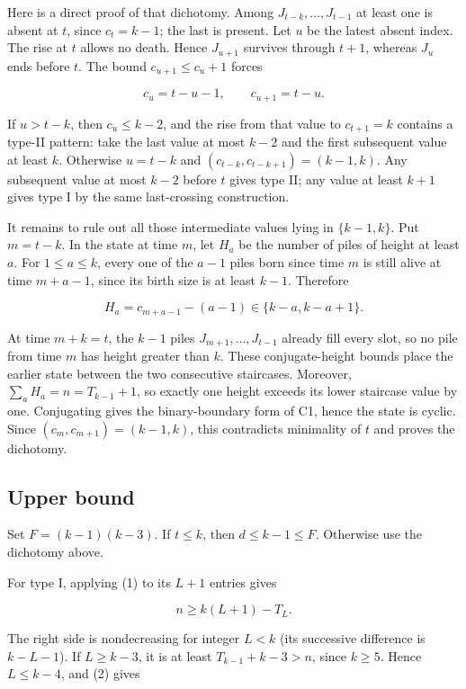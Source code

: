 \documentclass[11pt,a4paper]{article}
\begin{document}
Here is a direct proof of that dichotomy. Among \(J_{t-k},\ldots,J_{t-1}\) at least one is absent at \(t\), since \(c_t=k-1\); the last is present. Let \(u\) be the latest absent index. The rise at \(t\) allows no death. Hence \(J_{u+1}\) survives through \(t+1\), whereas \(J_u\) ends before \(t\). The bound \(c_{u+1}\le c_u+1\) forces

\[
c_u=t-u-1,\qquad c_{u+1}=t-u.
\]

If \(u>t-k\), then \(c_u\le k-2\), and the rise from that value to \(c_{t+1}=k\) contains a type-II pattern: take the last value at most \(k-2\) and the first subsequent value at least \(k\). Otherwise \(u=t-k\) and \((c_{t-k},c_{t-k+1})=(k-1,k)\). Any subsequent value at most \(k-2\) before \(t\) gives type II; any value at least \(k+1\) gives type I by the same last-crossing construction.

It remains to rule out all those intermediate values lying in \(\{k-1,k\}\). Put \(m=t-k\). In the state at time \(m\), let \(H_a\) be the number of piles of height at least \(a\). For \(1\le a\le k\), every one of the \(a-1\) piles born since time \(m\) is still alive at time \(m+a-1\), since its birth size is at least \(k-1\). Therefore

\[
H_a=c_{m+a-1}-(a-1)\in\{k-a,k-a+1\}.
\]

At time \(m+k=t\), the \(k-1\) piles \(J_{m+1},\ldots,J_{t-1}\) already fill every slot, so no pile from time \(m\) has height greater than \(k\). These conjugate-height bounds place the earlier state between the two consecutive staircases. Moreover, \(\sum_a H_a=n=T_{k-1}+1\), so exactly one height exceeds its lower staircase value by one. Conjugating gives the binary-boundary form of C1, hence the state is cyclic. Since \((c_m,c_{m+1})=(k-1,k)\), this contradicts minimality of \(t\) and proves the dichotomy.

\subsection{Upper bound}\label{upper-bound}

Set \(F=(k-1)(k-3)\). If \(t\le k\), then \(d\le k-1\le F\). Otherwise use the dichotomy above.

For type I, applying (1) to its \(L+1\) entries gives

\[
n\ge k(L+1)-T_L.
\]

The right side is nondecreasing for integer \(L<k\) (its successive difference is \(k-L-1\)). If \(L\ge k-3\), it is at least \(T_{k-1}+k-3>n\), since \(k\ge5\). Hence \(L\le k-4\), and (2) gives
\end{document}
